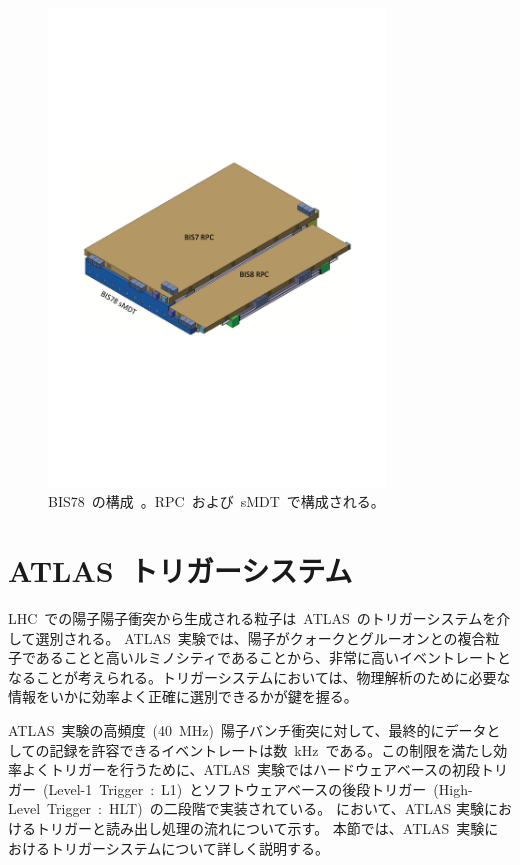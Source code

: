 \begin{figure}[H]
        \centering   
        \includegraphics[width=0.8\textwidth,page=1]{img/pdf/bis.pdf}
        \caption[RPC~BIS78~の構成]{BIS78~の構成~\cite{TR:04}。RPC~および~sMDT~で構成される。}
        \label{fig:bis}
\end{figure}

\section{ATLAS~トリガーシステム}\label{sec:ttri}
LHC~での陽子陽子衝突から生成される粒子は~ATLAS~のトリガーシステムを介して選別される。
ATLAS~実験では、陽子がクォークとグルーオンとの複合粒子であることと高いルミノシティであることから、非常に高いイベントレートとなることが考えられる。トリガーシステムにおいては、物理解析のために必要な情報をいかに効率よく正確に選別できるかが鍵を握る。

ATLAS~実験の高頻度~(40~MHz)~陽子バンチ衝突に対して、最終的にデータとしての記録を許容できるイベントレートは数~kHz~である。この制限を満たし効率よくトリガーを行うために、ATLAS~実験ではハードウェアベースの初段トリガー~(Level-1~Trigger~:~L1)~とソフトウェアベースの後段トリガー~(High-Level~Trigger~:~HLT)~の二段階で実装されている。
において、ATLAS 実験におけるトリガーと読み出し処理の流れについて示す。
本節では、ATLAS~実験におけるトリガーシステムについて詳しく説明する。


